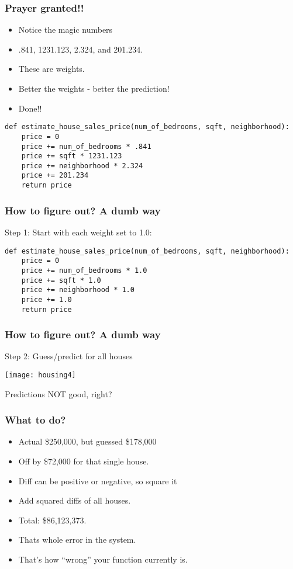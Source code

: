 \begin{frame}[fragile]\frametitle{Prayer granted!!}

	\begin{itemize}
	\item Notice the magic numbers
	\item .841, 1231.123, 2.324, and 201.234. 
	\item These are weights. 
	\item Better the weights - better the prediction!
	\item Done!!
	\end{itemize}
	
\begin{lstlisting}
def estimate_house_sales_price(num_of_bedrooms, sqft, neighborhood):
	price = 0
	price += num_of_bedrooms * .841
	price += sqft * 1231.123
	price += neighborhood * 2.324
	price += 201.234
	return price
\end{lstlisting}	
\end{frame}

\begin{frame}[fragile]\frametitle{How to figure out? A dumb way}
Step 1: Start with each weight set to 1.0:
\begin{lstlisting}
def estimate_house_sales_price(num_of_bedrooms, sqft, neighborhood):
	price = 0
	price += num_of_bedrooms * 1.0
	price += sqft * 1.0
	price += neighborhood * 1.0
	price += 1.0
	return price
\end{lstlisting}
\end{frame}

\begin{frame}[fragile]\frametitle{How to figure out? A dumb way}
Step 2: Guess/predict for all houses 
\begin{center}
\texttt{[image: housing4]}
\end{center}
Predictions NOT good, right?
\end{frame}

\begin{frame}[fragile]\frametitle{What to do?}
	\begin{itemize}
	\item Actual \$250,000, but guessed \$178,000
	\item Off by \$72,000 for that single house.
	\item Diff can be positive or negative, so square it
	\item Add squared diffs of all houses.
	\item Total: \$86,123,373. 
	\item Thats whole error in the system.
	\item That's how ``wrong'' your function currently is.
	\end{itemize}
\end{frame}

